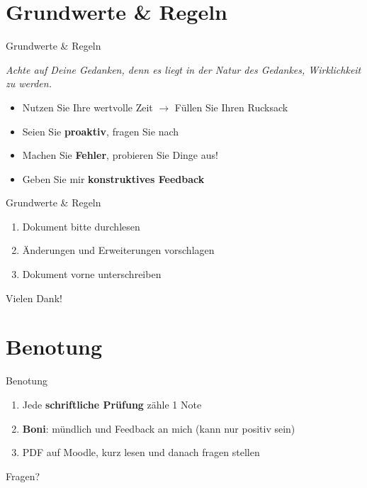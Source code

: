 \section{Grundwerte \& Regeln}
\begin{frame}{Grundwerte \& Regeln}
    \begin{overviewBox}
        \textit{Achte auf Deine Gedanken, denn es liegt in der Natur des Gedankes, Wirklichkeit zu werden.}
    \end{overviewBox}
    \begin{itemize}[<+->]
        \item[\faShoppingBag] Nutzen Sie Ihre wertvolle Zeit $\rightarrow$ Füllen Sie Ihren Rucksack
        \item[\faComments] Seien Sie \textbf{proaktiv}, fragen Sie nach
        \item[\faExclamationTriangle] Machen Sie \textbf{Fehler}, probieren Sie Dinge aus!
        \item[\faThumbsUp] Geben Sie mir \textbf{konstruktives Feedback}
    \end{itemize}
\end{frame}

\begin{frame}{Grundwerte \& Regeln}
    \begin{enumerate}
        \item Dokument bitte durchlesen
        \item Änderungen und Erweiterungen vorschlagen
        \item Dokument vorne unterschreiben
    \end{enumerate}
    Vielen Dank!
\end{frame}

\section{Benotung}
\begin{frame}{Benotung}
    \begin{enumerate}[<+->]
        \item[\faPen] Jede \textbf{schriftliche Prüfung} zähle 1 Note
        \item[\faMoneyBill] \textbf{Boni}: mündlich und Feedback an mich (kann nur positiv sein)
        \item[\faFilePdf] PDF auf Moodle, kurz lesen und danach fragen stellen
    \end{enumerate}
    \begin{center}

    \end{center}
\end{frame}

\begin{frame}{\faQuestionCircle}\Huge
    \begin{center}
        Fragen?
    \end{center}
\end{frame}